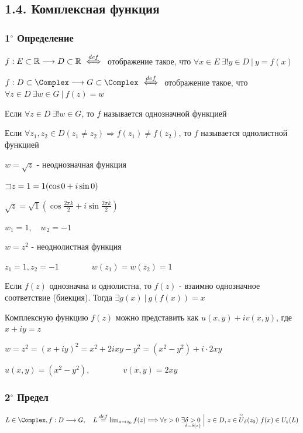 \documentclass[12pt]{article}
\begin{document}
\subsection{1.4. Комплексная функция}

\subsubsection{1$^\circ$ Определение}

\Mem $f : E \subset \mathbb{R} \longrightarrow D \subset \mathbb{R} \ \overset{def}{\Longleftrightarrow} \ $ отображение такое, 
что $\forall x \in E \ \exists! y \in D \ | \ y = f(x)$

\Def $f : D \subset \Complex \longrightarrow G \subset \Complex \ \overset{def}{\Longleftrightarrow} \ $ отображение такое, 
что $\forall z \in D \ \exists w \in G \ | \ f(z) = w$

\Defs Если $\forall z \in D \ \exists! w \in G$, то $f$ называется однозначной функцией

\Defs Если $\forall z_1, z_2 \in D (z_1 \neq z_2) \Longrightarrow f(z_1) \neq f(z_2)$, 
то $f$ называется однолистной функцией

 $w = \sqrt{z}$ - неоднозначная функция

$\mathord{\sqsupset} z = 1 = 1 (\cos 0 + i \sin 0)$

$\sqrt{z} = \sqrt{1} \left(\cos \frac{2\pi k}{2} + i \sin \frac{2\pi k}{2}\right)$

$w_1 = 1, \quad w_2 = -1$

 $w = z^2$ - неоднолистная функция

$z_1 = 1, z_2 = -1 \qquad\qquad w(z_1) = w(z_2) = 1$

\Nota Если $f(z)$ однозначна и однолистна, то $f(z)$ - взаимно однозначное соответствие (биекция). Тогда $\exists g(x) \ | \ g(f(x)) = x$

Комплексную функцию $f(z)$ можно представить как $u(x, y) + i v(x, y)$, где $x + iy = z$

\Ex $w = z^2 = (x + iy)^2 = x^2 + 2ixy - y^2 = (x^2 - y^2) + i \cdot 2xy$

$u(x, y) = (x^2 - y^2), \qquad\qquad v(x, y) = 2xy$

\subsubsection{2$^\circ$ Предел}

\Def $L \in \Complex, f : D \longrightarrow G, \quad L \overset{def}{=} \lim_{z \to z_0} f(z) \Longrightarrow
\forall \varepsilon > 0 \ \exists \underset{\delta = \delta(\varepsilon)}{\delta > 0} \ \Big| \ z \in D, z \in \overset{\circ}{U}_\delta(z_0) \ f(x) \in U_\varepsilon(L)$
\end{document}

